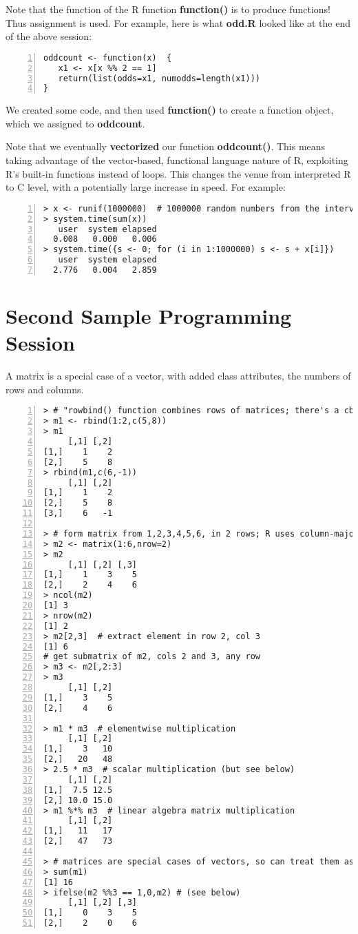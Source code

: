 Note that the function of the R function {\bf function()} is to produce
functions! Thus assignment is used. For example, here is what {\bf
odd.R} looked like at the end of the above session:

\begin{lstlisting}[numbers=left]
oddcount <- function(x)  {
   x1 <- x[x %% 2 == 1]
   return(list(odds=x1, numodds=length(x1)))
}
\end{lstlisting}

We created some code, and then used {\bf function()} to create a function
object, which we assigned to {\bf oddcount}.

Note that we eventually {\bf vectorized} our function {\bf oddcount()}.
This means taking advantage of the vector-based, functional language
nature of R, exploiting R's built-in functions instead of loops.  This
changes the venue from interpreted R to C level, with a potentially
large increase in speed.  For example:

\begin{lstlisting}[numbers=left]
> x <- runif(1000000)  # 1000000 random numbers from the interval (0,1)
> system.time(sum(x))
   user  system elapsed
  0.008   0.000   0.006
> system.time({s <- 0; for (i in 1:1000000) s <- s + x[i]})
   user  system elapsed
  2.776   0.004   2.859
\end{lstlisting}

\section{Second Sample Programming Session}

A matrix is a special case of a vector, with added class attributes,
the numbers of rows and columns.

\begin{lstlisting}[numbers=left]
> # "rowbind() function combines rows of matrices; there's a cbind() too
> m1 <- rbind(1:2,c(5,8))
> m1
     [,1] [,2]
[1,]    1    2
[2,]    5    8
> rbind(m1,c(6,-1))
     [,1] [,2]
[1,]    1    2
[2,]    5    8
[3,]    6   -1

> # form matrix from 1,2,3,4,5,6, in 2 rows; R uses column-major storage
> m2 <- matrix(1:6,nrow=2)
> m2
     [,1] [,2] [,3]
[1,]    1    3    5
[2,]    2    4    6
> ncol(m2)
[1] 3
> nrow(m2)
[1] 2
> m2[2,3]  # extract element in row 2, col 3
[1] 6
# get submatrix of m2, cols 2 and 3, any row
> m3 <- m2[,2:3]
> m3
     [,1] [,2]
[1,]    3    5
[2,]    4    6

> m1 * m3  # elementwise multiplication
     [,1] [,2]
[1,]    3   10
[2,]   20   48
> 2.5 * m3  # scalar multiplication (but see below)
     [,1] [,2]
[1,]  7.5 12.5
[2,] 10.0 15.0
> m1 %*% m3  # linear algebra matrix multiplication
     [,1] [,2]
[1,]   11   17
[2,]   47   73

> # matrices are special cases of vectors, so can treat them as vectors
> sum(m1)
[1] 16
> ifelse(m2 %%3 == 1,0,m2) # (see below)
     [,1] [,2] [,3]
[1,]    0    3    5
[2,]    2    0    6
\end{lstlisting}

